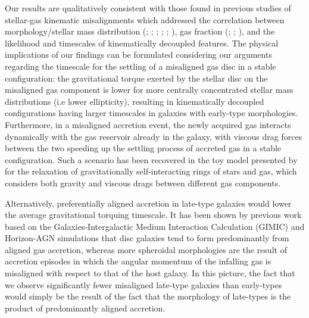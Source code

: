 \documentclass[fleqn,usenatbib]{mnras}
\begin{document}
Our results are qualitatively consistent with those found in previous studies of stellar-gas kinematic misalignments which addressed the correlation between morphology/stellar mass distribution (\citealt{Davis2011}; \citealt{CdpLagos2015}; \citealt{Bryant2019}; \citealt{Duckworth}; \citealt{Khim2020I}; \citealt{Zhou2022}), gas fraction (\citealt{CdpLagos2015}; \citealt{Duckworth}; \citealt{Khim2020I}), and the likelihood and timescales of kinematically decoupled features. The physical implications of our findings can be formulated considering our arguments regarding the timescale for the settling of a misaligned gas disc in a stable configuration: the gravitational torque exerted by the stellar disc on the misaligned gas component is lower for more centrally concentrated stellar mass distributions (i.e lower ellipticity), resulting in kinematically decoupled configurations having larger timescales in galaxies with early-type morphologies. Furthermore, in a misaligned accretion event, the newly acquired gas interacts dynamically with the gas reservoir already in the galaxy, with viscous drag forces between the two speeding up the settling process of accreted gas in a stable configuration. Such a scenario has been recovered in the toy model presented by \cite{Khim2020II} for the relaxation of gravitationally self-interacting rings of stars and gas, which considers both gravity and viscous drags between different gas components. 

Alternatively, preferentially aligned accretion in late-type galaxies \citep{Bryant2019} would lower the average gravitational torquing timescale. It has been shown by previous work based on the Galaxies-Intergalactic Medium Interaction Calculation (GIMIC) \citep{Sales2012} and Horizon-AGN \citep{Welker2017} simulations that disc galaxies tend to form predominantly from aligned gas accretion, whereas more spheroidal morphologies are the result of accretion episodes in which the angular momentum of the infalling gas is misaligned with respect to that of the host galaxy. In this picture, the fact that we observe significantly fewer misaligned late-type galaxies than early-types would simply be the result of the fact that the morphology of late-types is the product of predominantly aligned accretion. 
\end{document}
